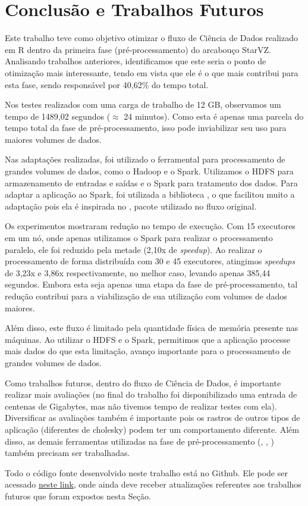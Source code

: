 \chapter{Conclusão e Trabalhos Futuros} \label{ch:conclusion}

Este trabalho teve como objetivo otimizar o fluxo de Ciência de Dados realizado 
em R dentro da primeira fase (pré-processamento) do arcabouço StarVZ. 
Analisando trabalhos anteriores, identificamos que este seria o ponto de 
otimização mais interessante, tendo em vista que ele é o que mais contribui 
para esta fase, sendo responsável por 40,62\% do tempo total.

Nos testes realizados com uma carga de trabalho de 12 GB, observamos um tempo 
de 1489,02 segundos ($\approx$ 24 minutos). Como esta é apenas uma parcela do 
tempo total da fase de pré-processamento, isso pode inviabilizar seu uso para 
maiores volumes de dados.

Nas adaptações realizadas, foi utilizado o ferramental para processamento de 
grandes volumes de dados, como o Hadoop e o Spark. Utilizamos o HDFS para 
armazenamento de entradas e saídas e o Spark para tratamento dos dados. Para 
adaptar a aplicação ao Spark, foi utilizada a biblioteca , o 
que facilitou muito a adaptação pois ela é inspirada no 
, pacote utilizado no fluxo original.

Os experimentos mostraram redução no tempo de execução. Com 15 executores 
em um nó, onde apenas utilizamos o Spark para realizar o 
processamento paralelo, ele foi reduzido pela metade (2,10x de \emph{speedup}). 
Ao realizar o processamento de forma distribuída com 30 e 45 executores, 
atingimos \emph{speedups} de 3,23x e 3,86x respectivamente, no melhor caso, 
levando apenas 385,44 segundos. Embora esta seja apenas uma etapa da fase de 
pré-processamento, tal redução contribui para a viabilização de sua utilização 
com volumes de dados maiores.

Além disso, este fluxo é limitado pela quantidade física de memória presente 
nas máquinas. Ao utilizar o HDFS e o Spark, permitimos que a aplicação processe 
mais dados do que esta limitação, avanço importante para o processamento de 
grandes volumes de dados.

Como trabalhos futuros, dentro do fluxo de Ciência de Dados, é importante 
realizar mais avaliações (no final do trabalho foi disponibilizado uma entrada 
de centenas de Gigabytes, mas não tivemos tempo de realizar testes com ela). 
Diversificar as avaliações também é importante pois os rastros de outros tipos 
de aplicação (diferentes de cholesky) podem ter um comportamento diferente. 
Além disso, as demais ferramentas utilizadas na fase de pré-processamento 
(, , ) também 
precisam ser trabalhadas.

Todo o código fonte desenvolvido neste trabalho está no Github. Ele pode ser 
acessado \href{https://github.com/aksmiyazaki/starvz/tree/spark_starvz}{neste 
link}, onde ainda deve receber atualizações referentes aos trabalhos futuros 
que foram expostos nesta Seção.